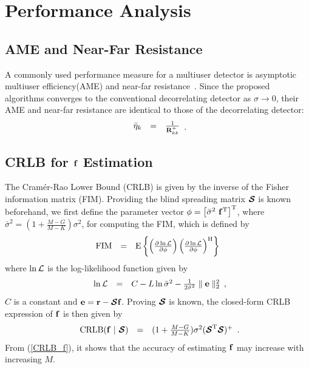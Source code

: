 \documentclass[a4paper,10pt,fleqn, twocolumn]{IEEETran}
\newcommand{\br}{{\mathbf r}}
\newcommand{\bbf}{{\bf f}}
\newcommand{\bR}{{\bf R}}
\newcommand{\bcS}{{\mbox {\boldmath ${\cal S}$}}}
\begin{document}
\section{Performance Analysis}
\subsection{AME and Near-Far Resistance}
A commonly used performance measure for a multiuser detector is
asymptotic multiuser efficiency(AME) and near-far
resistance~\cite{Verd98}. Since the proposed algorithms converges
to the conventional decorrelating detector as $\sigma\rightarrow
0$, their AME and near-far resistance are identical to those of
the decorrelating detector:
\begin{equation}
\begin{array}{rcl}
\bar{\eta}_k&=&\frac{1}{\bR_{kk}^{+}}
\end{array}.
\end{equation}
\subsection{CRLB for $\bbf$ Estimation}
The Cram\'{e}r-Rao Lower Bound (CRLB) is given by the inverse of
the Fisher information matrix (FIM). Providing the blind spreading
matrix $\bcS$ is known beforehand, we first define the parameter
vector $\mathbf{\phi} = \left[\bar{\sigma}^{2}\ \bbf^{\rm
T}\right]^{\rm T}$, where $\bar{\sigma}^{2}
=(1+\frac{M-G}{M-K})\sigma^{2}$, for computing the FIM, which is
defined by
\begin{equation}
\begin{array}{rcl}
{\rm FIM} &=& {\rm E} \left\{ \left( \frac{\partial \ln{\cal
L}}{\partial \mathbf{\phi}} \right) \left( \frac{\partial \ln{\cal
L}}{\partial \mathbf{\phi}} \right)^{\rm H} \right\} \label{fim}
\end{array}
\end{equation}
\noindent where $\ln{\cal L}$ is the log-likelihood function given
by
\begin{equation}
\begin{array}{rcl}
\ln{\cal
L}&=&C-L\ln\bar{\sigma}^2-\frac{1}{2\bar{\sigma}^2}\parallel\mathbf{e}\parallel_2^2
\end{array},\label{logl}
\end{equation}
\noindent $C$ is a constant and $\mathbf{e}=\br-\bcS\bbf$. Proving
$\bcS$ is known, the closed-form CRLB expression of $\bbf$ is then
given by
\begin{equation}
\begin{array}{rcl}
{\rm CRLB}(\bbf\ |\ \bcS) &
=&(1+\frac{M-G}{M-K})\sigma^{2}(\bcS^{\rm T}\bcS)^{\rm +}
\end{array}.\label{CRLB_f}
\end{equation}
\noindent From (\ref{CRLB_f}), it shows that the accuracy of
estimating $\bbf$ may increase with increasing $M$.
\end{document}
